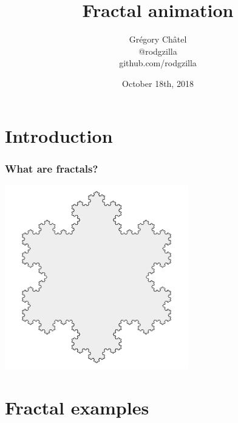 \documentclass[9pt]{beamer}
\title{Fractal animation}
\author[G. Châtel]{Grégory Châtel\\\vspace{0.3cm}@rodgzilla\\github.com/rodgzilla}
\date{October 18th, 2018}
\begin{document}
\begin{frame}

  \maketitle

\end{frame}

\section{Introduction}

\begin{frame}

  \frametitle{What are fractals?}

  \begin{center}
    \includegraphics[width = 8cm]{images/koch_snowflake.png}
  \end{center}

\end{frame}

\section{Fractal examples}
\end{document}
